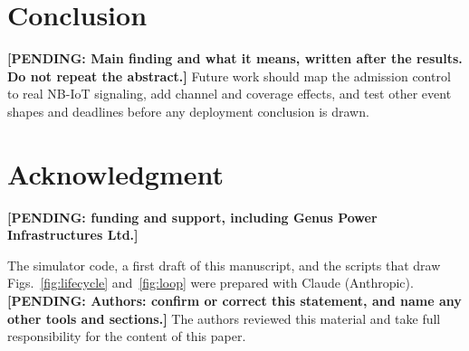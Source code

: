 \documentclass[conference]{IEEEtran}
\newif\ifblind
\newcommand{\pending}[1]{\textbf{[PENDING: #1]}}
\begin{document}
\section{Conclusion}
\pending{Main finding and what it means, written after the results. Do not repeat the
abstract.} Future work should map the admission control to real NB-IoT signaling, add
channel and coverage effects, and test other event shapes and deadlines before any
deployment conclusion is drawn.

\section*{Acknowledgment}
\ifblind\else
\pending{funding and support, including Genus Power Infrastructures Ltd.}
\fi
The simulator code, a first draft of this manuscript, and the scripts that draw
Figs.~\ref{fig:lifecycle} and~\ref{fig:loop} were prepared with Claude (Anthropic).
\pending{Authors: confirm or correct this statement, and name any other tools and
sections.} The authors reviewed this material and take full responsibility for the
content of this paper.
\end{document}
